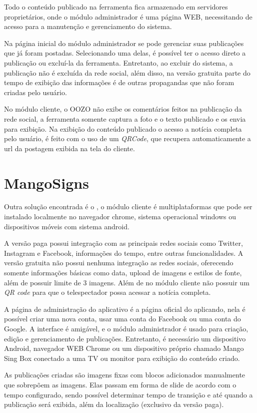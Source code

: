Todo o conteúdo publicado na ferramenta fica armazenado em servidores proprietários, onde o módulo administrador é uma página WEB, necessitando de acesso para a manutenção e gerenciamento do sistema. 

Na página inicial do módulo administrador se pode gerenciar suas publicações que já foram postadas. Selecionando uma delas, é possível ter o acesso direto a publicação ou excluí-la da ferramenta. Entretanto, ao excluir do sistema, a publicação não é excluída da rede social, além disso, na versão gratuita parte do tempo de exibição das informações é de outras propagandas que não foram criadas pelo usuário. 

No módulo cliente, o OOZO não exibe os comentários feitos na publicação da rede social, a ferramenta somente captura a foto e o texto publicado e os envia para exibição. Na exibição do conteúdo publicado o acesso a notícia completa pelo usuário, é feito com o uso de um \textit{QRCode}, que recupera automaticamente a url da postagem exibida na tela do cliente.

\section{MangoSigns}
\label{sec:mango}
Outra solução encontrada é o \cite{mango2017}, o módulo cliente é multiplataformas que pode ser instalado localmente no navegador chrome, sistema operacional windows ou dispositivos móveis com sistema android.

A versão paga possui integração com as principais redes sociais como Twitter, Instagram e Facebook, informações do tempo, entre outras funcionalidades. A versão gratuita não possui nenhuma integração as redes sociais, oferecendo somente informações básicas como data, upload de imagens e estilos de fonte, além de possuir limite de 3 imagens. Além de no módulo cliente não possuir um \textit{QR code} para que o telespectador possa acessar a notícia completa.

A página de administração do aplicativo é a página oficial do aplicando, nela é possível criar uma nova conta, usar uma conta do Facebook ou uma conta do Google. A interface é amigável, e o módulo administrador é usado para criação, edição e gerenciamento de publicações. Entretanto, é necessário um dispositivo Android, navegador WEB Chrome ou um dispositivo próprio chamado Mango Sing Box conectado a uma TV ou monitor para exibição do conteúdo criado.

As publicações criadas são imagens fixas com blocos adicionados manualmente que sobrepõem as imagens. Elas passam em forma de slide de acordo com o tempo configurado, sendo possível determinar tempo de transição e até quando a publicação será exibida, além da localização (exclusivo da versão paga). 

